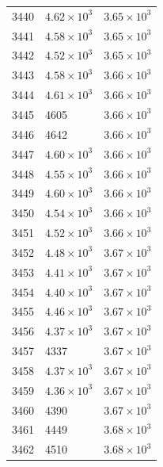 \begin{table}[H]
\begin{tabular}{lll}
3440 & $\displaystyle 4.62 \times 10^{3}$ & $\displaystyle 3.65 \times 10^{3}$ \\
3441 & $\displaystyle 4.58 \times 10^{3}$ & $\displaystyle 3.65 \times 10^{3}$ \\
3442 & $\displaystyle 4.52 \times 10^{3}$ & $\displaystyle 3.65 \times 10^{3}$ \\
3443 & $\displaystyle 4.58 \times 10^{3}$ & $\displaystyle 3.66 \times 10^{3}$ \\
3444 & $\displaystyle 4.61 \times 10^{3}$ & $\displaystyle 3.66 \times 10^{3}$ \\
3445 & 4605 & $\displaystyle 3.66 \times 10^{3}$ \\
3446 & 4642 & $\displaystyle 3.66 \times 10^{3}$ \\
3447 & $\displaystyle 4.60 \times 10^{3}$ & $\displaystyle 3.66 \times 10^{3}$ \\
3448 & $\displaystyle 4.55 \times 10^{3}$ & $\displaystyle 3.66 \times 10^{3}$ \\
3449 & $\displaystyle 4.60 \times 10^{3}$ & $\displaystyle 3.66 \times 10^{3}$ \\
3450 & $\displaystyle 4.54 \times 10^{3}$ & $\displaystyle 3.66 \times 10^{3}$ \\
3451 & $\displaystyle 4.52 \times 10^{3}$ & $\displaystyle 3.66 \times 10^{3}$ \\
3452 & $\displaystyle 4.48 \times 10^{3}$ & $\displaystyle 3.67 \times 10^{3}$ \\
3453 & $\displaystyle 4.41 \times 10^{3}$ & $\displaystyle 3.67 \times 10^{3}$ \\
3454 & $\displaystyle 4.40 \times 10^{3}$ & $\displaystyle 3.67 \times 10^{3}$ \\
3455 & $\displaystyle 4.46 \times 10^{3}$ & $\displaystyle 3.67 \times 10^{3}$ \\
3456 & $\displaystyle 4.37 \times 10^{3}$ & $\displaystyle 3.67 \times 10^{3}$ \\
3457 & 4337 & $\displaystyle 3.67 \times 10^{3}$ \\
3458 & $\displaystyle 4.37 \times 10^{3}$ & $\displaystyle 3.67 \times 10^{3}$ \\
3459 & $\displaystyle 4.36 \times 10^{3}$ & $\displaystyle 3.67 \times 10^{3}$ \\
3460 & 4390 & $\displaystyle 3.67 \times 10^{3}$ \\
3461 & 4449 & $\displaystyle 3.68 \times 10^{3}$ \\
3462 & 4510 & $\displaystyle 3.68 \times 10^{3}$ \\

\end{tabular}
\end{table}
